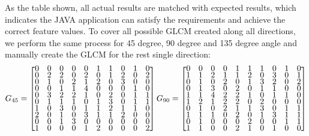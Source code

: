 As the table shown, all actual results are matched with expected results, which indicates the JAVA application can satisfy the requirements and achieve the correct feature values. To cover all possible GLCM created along all directions, we perform the same process for 45 degree, 90 degree and 135 degree angle and manually create the GLCM for the rest single direction:
\begin{align*}
G_{45} = 
\renewcommand{\arraystretch}{0.5}
\begin{bmatrix}
     0&     0&     0&     0&     0 &    1&     1&     0&     1&     0\\
     0&     2&     2&     0&     2 &    0&     1&     2&     0&     2\\
     0&     1&     0&     2&     1 &    2&     0&     3&     0&     0\\
     0&     0&     1&     1&     4 &    0&     0&     0&     1&     0\\
     0&     3&     2&     2&     1 &    0&     2&     0&     1&     1\\
     0&     1&     1&     1&     0 &    1&     3&     0&     1&     1\\
     1&     0&     3&     0&     1 &    1&     2&     1&     1&     0\\
     2&     0&     1&     0&     3 &    1&     1&     2&     0&     0\\
     0&     0&     1&     3&     0 &    0&     0&     0&     0&     0\\
     1&     0&     0&     0&     1 &    2&     0&     0&     0&     2
\end{bmatrix}
G_{90} = 
\begin{bmatrix}
     0&     0&     0&     0&     1&     1&     1&     0&     1&     0\\
     1&     1&     2&     1&     1&     2&     0&     3&     0&     1\\
     0&     1&     0&     2&     0&     1&     3&     2&     0&     2\\
     0&     1&     3&     0&     2&     0&     1&     1&     0&     0\\
     1&     1&     4&     2&     2&     1&     0&     1&     1&     0\\
     1&     2&     1&     2&     2&     0&     2&     0&     0&     0\\
     0&     1&     0&     2&     1&     1&     3&     0&     1&     1\\
     1&     1&     1&     0&     2&     0&     1&     3&     1&     1\\
     0&     1&     0&     0&     0&     2&     0&     0&     1&     1\\
     1&     1&     0&     0&     2&     1&     0&     1&     0&     0
\end{bmatrix}
\end{align*}
